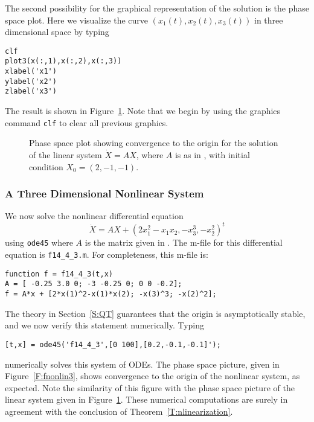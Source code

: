 \documentclass{ximera}
\begin{document}
The second possibility for the graphical representation of the solution
is the phase space plot.  Here we visualize the curve
$(x_1(t),x_2(t),x_3(t))$ in three dimensional space by typing
\begin{verbatim}
clf
plot3(x(:,1),x(:,2),x(:,3))
xlabel('x1')
ylabel('x2')
zlabel('x3')
\end{verbatim}
The result is shown in Figure~\ref{fig:flinear2}.  Note that we begin by 
using the \Matlab graphics command {\tt clf} to clear all previous graphics.
\begin{figure}[htb]
   \centerline{%
   }
   \caption{Phase space plot showing convergence to the origin for the 
	solution of the linear system $\dot X=AX$, where $A$ is as in 
	\protect{}, with initial condition $X_0=(2,-1,-1)$.}
   \label{fig:flinear2}
\end{figure}


\subsubsection*{A Three Dimensional Nonlinear System}

We now solve the nonlinear differential equation 
\begin{equation*}  \label{E:fnonlin}
\dot{X} = AX + (2x_1^2 - x_1x_2, -x_3^3, -x_2^2)^t
\end{equation*}
using {\tt ode45} where $A$ is the matrix given in .  The 
m-file for this differential equation is {\tt f14\_4\_3.m}. For completeness, 
this m-file is:
\begin{verbatim}
function f = f14_4_3(t,x)
A = [ -0.25 3.0 0; -3 -0.25 0; 0 0 -0.2];
f = A*x + [2*x(1)^2-x(1)*x(2); -x(3)^3; -x(2)^2];
\end{verbatim}
The theory in Section~\ref{S:QT} guarantees that the origin is
asymptotically stable, and we now verify this statement numerically.  Typing 
\begin{verbatim}
[t,x] = ode45('f14_4_3',[0 100],[0.2,-0.1,-0.1]');
\end{verbatim}
numerically solves this system of ODEs.  The phase space picture, given in
Figure~\ref{F:fnonlin3}, shows convergence to the origin of the nonlinear
system, as expected.  Note the similarity of this figure with the phase
space picture of the linear system given in Figure~\ref{fig:flinear2}. 
These numerical computations are surely in agreement with the conclusion
of Theorem~\ref{T:nlinearization}.
\end{document}
